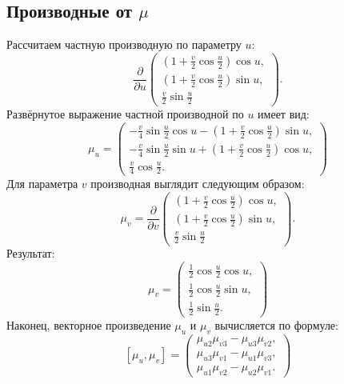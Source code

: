 \documentclass{article}
\begin{document}
        \subsection*{Производные от $\mu$}
        Рассчитаем частную производную по параметру $u$:
        \[
        \frac{\partial}{\partial u} 
        \begin{pmatrix}
        \left( 1 + \frac{v}{2} \cos{\frac{u}{2}} \right) \cos{u}, \\
        \left( 1 + \frac{v}{2} \cos{\frac{u}{2}} \right) \sin{u}, \\
        \frac{v}{2} \sin{\frac{u}{2}}
        \end{pmatrix}.
        \]
        Развёрнутое выражение частной производной по $u$ имеет вид:
        \[
        \mu_u = \begin{pmatrix}
            -\frac{v}{4} \sin{\frac{u}{2}} \cos{u} - \left(1 + \frac{v}{2} \cos{\frac{u}{2}}\right) \sin{u}, \\
            -\frac{v}{4} \sin{\frac{u}{2}} \sin{u} + \left(1 + \frac{v}{2} \cos{\frac{u}{2}}\right) \cos{u}, \\
            \frac{v}{4} \cos{\frac{u}{2}}.
        \end{pmatrix}
        \]
        Для параметра $v$ производная выглядит следующим образом:
        \[
        \mu_v = \frac{\partial}{\partial v} 
        \begin{pmatrix}
        \left( 1 + \frac{v}{2} \cos{\frac{u}{2}} \right) \cos{u}, \\
        \left( 1 + \frac{v}{2} \cos{\frac{u}{2}} \right) \sin{u}, \\
        \frac{v}{2} \sin{\frac{u}{2}}
        \end{pmatrix}.
        \]
        Результат:
        \[
        \mu_v = \begin{pmatrix}
            \frac{1}{2} \cos{\frac{u}{2}} \cos{u}, \\
            \frac{1}{2} \cos{\frac{u}{2}} \sin{u}, \\
            \frac{1}{2} \sin{\frac{u}{2}}.
        \end{pmatrix}
        \]
        Наконец, векторное произведение $\mu_u$ и $\mu_v$ вычисляется по формуле:
        \[
        [\mu_u, \mu_v] = \begin{pmatrix}
            \mu_{u2} \mu_{v3} - \mu_{u3} \mu_{v2}, \\
            \mu_{u3} \mu_{v1} - \mu_{u1} \mu_{v3}, \\
            \mu_{u1} \mu_{v2} - \mu_{u2} \mu_{v1}.
        \end{pmatrix}
        \]
        
\end{document}
